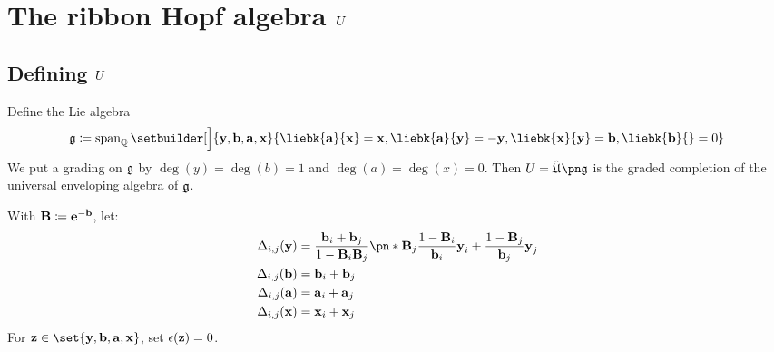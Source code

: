 \documentclass{beamer}
\begin{document}
\section{The ribbon Hopf algebra $U$}

\subsection{Defining $U$}

\begin{frame}
        \begin{definition}
        Define the Lie algebra
        \begin{equation*}
        \fg \defeq \Span_{\Q}\setbuilder[\Big]{\yo, \bo, \ao, \xo}{
                \liebk{\ao}{\xo} = \xo,
                \liebk{\ao}{\yo} = -\yo,
                \liebk{\xo}{\yo} = \bo,
                \liebk{\bo}{ } = 0
        }
        \end{equation*}
        We put a grading on $\mathfrak{g}$ by $\deg(y) = \deg(b) = 1$ and
        $\deg(a) = \deg(x) = 0$. Then $\CU=\uea*{\fg}$ is the graded completion
        of the universal enveloping algebra of $\mathfrak{g}$.
        \end{definition}
\end{frame}

\begin{frame}
        \begin{definition}
                With $\boldsymbol{\mathbf{B}} \coloneq \boldsymbol{\mathbf{e}}^{-\boldsymbol{\mathbf{b}}}$, let:
                \begin{equation}\begin{aligned}
                        \comult_{i,j}(\yo) &=
                        \frac{\bo_i+\bo_j}{1-\Bo_i\Bo_j} \pn*{
                                \Bo_j\frac{1-\Bo_i}{\bo_i}\yo_i+
                                \frac{1-\Bo_j}{\bo_j}\yo_j
                        }\\
                        \comult_{i,j}(\bo) &= \bo_i + \bo_j\\
                        \comult_{i,j}(\ao) &= \ao_i + \ao_j\\
                        \comult_{i,j}(\xo) &= \xo_i + \xo_j\\
                \end{aligned}\end{equation}
                For $\zo\in\set{\yo, \bo, \ao, \xo}$, set $\epsilon(\boldsymbol{\mathbf{z}})=0$.
        \end{definition}
\end{frame}
\end{document}
